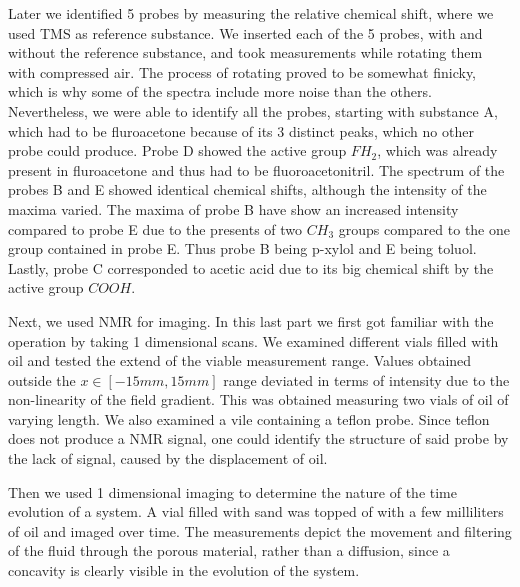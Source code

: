 \documentclass[11 pt]{article}
\begin{document}
 Later we identified 5 probes by measuring the relative chemical shift, where we used TMS as reference substance.
 We inserted each of the 5 probes, with and without the reference substance, and took measurements while rotating them with compressed air. The process of rotating proved to be somewhat finicky, which is why some of the spectra include more noise than the others. Nevertheless, we were able to identify all the probes, starting with substance A, which had to be fluroacetone because of its 3 distinct peaks, which no other probe could produce. Probe D showed the active group $FH_2$, which was already present in fluroacetone and thus had to be fluoroacetonitril. The spectrum of the probes B and E showed identical chemical shifts, although the intensity of the maxima varied. The maxima of probe B have show an increased intensity compared to probe E due to the presents of two $CH_3$ groups compared to the one group contained in probe E. Thus probe B being p-xylol and E being toluol. Lastly, probe C corresponded to acetic acid due to its big chemical shift by the active group $COOH$.


  Next, we used NMR for imaging. In this last part we first got familiar with the operation by taking 1 dimensional scans. 
We examined different vials filled with oil and tested the extend of the viable measurement range. Values obtained outside the $x\in\left[-15mm, 15mm\right]$ range deviated in terms of intensity due to the non-linearity of the field gradient. This was obtained measuring two vials of oil of varying length. We also examined a vile containing a teflon probe. Since teflon does not produce a NMR signal, one could identify the structure of said probe by the lack of signal, caused by the displacement of oil.
  
Then we used 1 dimensional imaging to determine the nature of the time evolution of a system. A vial filled with sand was topped of with a few milliliters of oil and imaged over time. The measurements depict the movement and filtering of the fluid through the porous material, rather than a diffusion, since a concavity is clearly visible in the evolution of the system.
\end{document}
